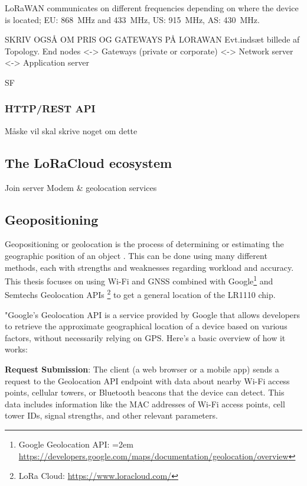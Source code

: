 \ac{LoRaWAN} communicates on different frequencies depending on where the device is located; EU: \SI{868}{\mega\hertz} and \SI{433}{\mega\hertz}, US: \SI{915}{\mega\hertz}, AS: \SI{430}{\mega\hertz}.

SKRIV OGSÅ OM PRIS OG GATEWAYS PÅ LORAWAN
Evt.indsæt billede af Topology. End nodes <-> Gateways (private or corporate) <-> Network server <-> Application server

\ac{SF}

\subsubsection{HTTP/REST API}
Måske vil skal skrive noget om dette

\subsection{The LoRaCloud ecosystem}
Join server
Modem \& geolocation services

\subsection{Geopositioning}
Geopositioning or geolocation is the process of determining or estimating the geographic position of an object \cite{ISO19130}. This can be done using many different methods, each with strengths and weaknesses regarding workload and accuracy. This thesis focuses on using Wi-Fi and \ac{GNSS} combined with Google\footnote{Google Geolocation API: \hangindent=2em \url{https://developers.google.com/maps/documentation/geolocation/overview}} and Semtechs Geolocation APIs \footnote{LoRa Cloud: \url{https://www.loracloud.com/}} to get a general location of the LR1110 chip.



"Google's Geolocation API is a service provided by Google that allows developers to retrieve the approximate geographical location of a device based on various factors, without necessarily relying on \ac{GPS}. Here's a basic overview of how it works:

\textbf{Request Submission}: The client (a web browser or a mobile app) sends a request to the Geolocation API endpoint with data about nearby Wi-Fi access points, cellular towers, or Bluetooth beacons that the device can detect. This data includes information like the \ac{MAC} addresses of Wi-Fi access points, cell tower IDs, signal strengths, and other relevant parameters.

